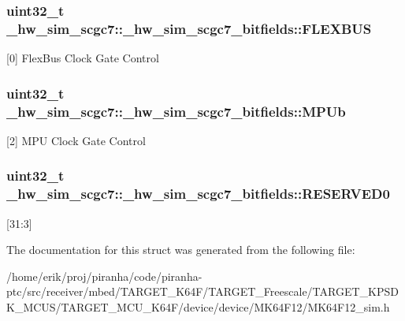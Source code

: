 \subsubsection[{\texorpdfstring{F\+L\+E\+X\+B\+US}{FLEXBUS}}]{\setlength{\rightskip}{0pt plus 5cm}uint32\+\_\+t \+\_\+hw\+\_\+sim\+\_\+scgc7\+::\+\_\+hw\+\_\+sim\+\_\+scgc7\+\_\+bitfields\+::\+F\+L\+E\+X\+B\+US}\hypertarget{struct__hw__sim__scgc7_1_1__hw__sim__scgc7__bitfields_a30228123d7951ff4b9129458722cbbc1}{}\label{struct__hw__sim__scgc7_1_1__hw__sim__scgc7__bitfields_a30228123d7951ff4b9129458722cbbc1}
\mbox{[}0\mbox{]} Flex\+Bus Clock Gate Control 
\subsubsection[{\texorpdfstring{M\+P\+Ub}{MPUb}}]{\setlength{\rightskip}{0pt plus 5cm}uint32\+\_\+t \+\_\+hw\+\_\+sim\+\_\+scgc7\+::\+\_\+hw\+\_\+sim\+\_\+scgc7\+\_\+bitfields\+::\+M\+P\+Ub}\hypertarget{struct__hw__sim__scgc7_1_1__hw__sim__scgc7__bitfields_a69885aaa5b66bee51c51c3740d3c25d8}{}\label{struct__hw__sim__scgc7_1_1__hw__sim__scgc7__bitfields_a69885aaa5b66bee51c51c3740d3c25d8}
\mbox{[}2\mbox{]} M\+PU Clock Gate Control 
\subsubsection[{\texorpdfstring{R\+E\+S\+E\+R\+V\+E\+D0}{RESERVED0}}]{\setlength{\rightskip}{0pt plus 5cm}uint32\+\_\+t \+\_\+hw\+\_\+sim\+\_\+scgc7\+::\+\_\+hw\+\_\+sim\+\_\+scgc7\+\_\+bitfields\+::\+R\+E\+S\+E\+R\+V\+E\+D0}\hypertarget{struct__hw__sim__scgc7_1_1__hw__sim__scgc7__bitfields_a3205c621cf5797fd2d5f79c6da81c73b}{}\label{struct__hw__sim__scgc7_1_1__hw__sim__scgc7__bitfields_a3205c621cf5797fd2d5f79c6da81c73b}
\mbox{[}31\+:3\mbox{]} 

The documentation for this struct was generated from the following file\+:\begin{DoxyCompactItemize}
\item 
/home/erik/proj/piranha/code/piranha-\/ptc/src/receiver/mbed/\+T\+A\+R\+G\+E\+T\+\_\+\+K64\+F/\+T\+A\+R\+G\+E\+T\+\_\+\+Freescale/\+T\+A\+R\+G\+E\+T\+\_\+\+K\+P\+S\+D\+K\+\_\+\+M\+C\+U\+S/\+T\+A\+R\+G\+E\+T\+\_\+\+M\+C\+U\+\_\+\+K64\+F/device/device/\+M\+K64\+F12/M\+K64\+F12\+\_\+sim.\+h\end{DoxyCompactItemize}
